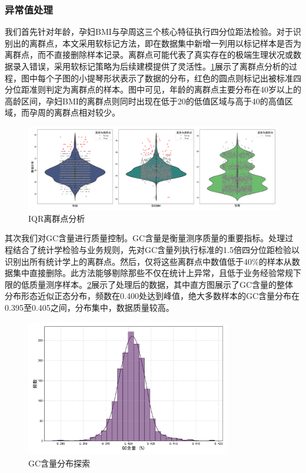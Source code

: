 \subsubsection{异常值处理}

我们首先针对年龄，孕妇BMI与孕周这三个核心特征执行四分位距法检验。对于识别出的离群点，本文采用软标记方法，即在数据集中新增一列用以标记样本是否为离群点，而不直接删除样本记录。离群点可能代表了真实存在的极端生理状况或数据录入错误，采用软标记策略为后续建模提供了灵活性。\cref{fig:IQR离群点分析}展示了离群点分析的过程，图中每个子图的小提琴形状表示了数据的分布，红色的圆点则标记出被标准四分位距准则判定为离群点的样本。图中可见，年龄的离群点主要分布在40岁以上的高龄区间，孕妇BMI的离群点则同时出现在低于20的低值区域与高于40的高值区域，而孕周的离群点相对较少。

\begin{figure}[h!]
\centering
\includegraphics[width=1\textwidth]{figs/2模型准备/图3_IQR离群点分析.png}
\caption{IQR离群点分析}
\label{fig:IQR离群点分析}
\end{figure}

其次我们对GC含量进行质量控制。GC含量是衡量测序质量的重要指标。处理过程结合了统计学检验与业务规则，先对GC含量列执行标准的1.5倍四分位距检验以识别出所有统计学上的离群点。然后，仅将这些离群点中数值低于40\%的样本从数据集中直接删除。此方法能够剔除那些不仅在统计上异常，且低于业务经验常规下限的低质量测序样本。\cref{fig:GC含量分布探索}展示了处理后的数据，其中直方图展示了GC含量的整体分布形态近似正态分布，频数在0.400处达到峰值，绝大多数样本的GC含量分布在0.395至0.405之间，分布集中，数据质量较高。

\begin{figure}[h!]
\centering
\includegraphics[width=0.8\textwidth]{figs/2模型准备/图4_GC含量分布探索.png}
\caption{GC含量分布探索}
\label{fig:GC含量分布探索}
\end{figure}

